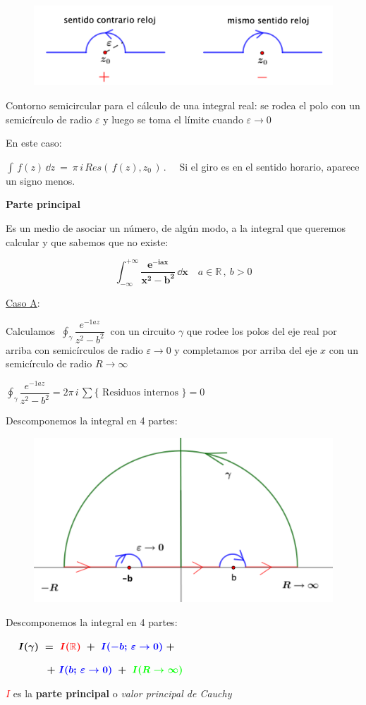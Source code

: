\begin{multicols}{2}
 \begin{figure}[H]
	\centering
	\includegraphics[width=.5\textwidth]{imagenes/img43-02.png}
\end{figure}

Contorno semicircular para el cálculo de una integral real: se rodea el polo con un semicírculo de radio $\varepsilon$ y luego se toma el límite cuando $\varepsilon \to 0$

En este caso:	
\end{multicols}
$\displaystyle \int\, f(z)\, \dd z \ = \ \pi\, i\, Res(\, f(z),z_0\, )\, . \quad$
Si el giro es en el sentido horario, aparece un signo menos.


\vspace{5mm} \textbf{Parte principal}

Es un medio de asociar un número, de algún modo, a la integral que queremos calcular y que sabemos que no existe:

$$\boldsymbol { \displaystyle \int_{-\infty}^{+\infty} \dfrac{e^{-iax}}{x^2-b^2}  \, \dd x} \quad a\in \mathbb R\, , \ b>0$$

\vspace{5mm}

\underline{Caso A}: 

Calculamos $\ \displaystyle \oint_\gamma \dfrac{e^{-1az}}{z^2-b^2}\ $ con un circuito $\gamma$ que rodee los polos del eje real por arriba con semicírculos de radio $\varepsilon \to 0$ y completamos por arriba del eje $x$ con un semicírculo de radio $R\to \infty$

$\displaystyle \oint_\gamma \dfrac{e^{-1az}}{z^2-b^2} = 2\pi\, i \, \sum \{ \text{ Residuos internos } \} =0$

Descomponemos la integral en 4 partes: 

\begin{multicols}{2}
 \begin{figure}[H]
	\centering
	\includegraphics[width=.5\textwidth]{imagenes/img43-03.png}
\end{figure}
Descomponemos la integral en 4 partes: 

$\boldsymbol{ \quad I(\gamma) \ = \ \textcolor{red}{I(\mathbb R)} \ + \ \textcolor{blue}{I(-b;\, \varepsilon\to 0)} \ + }$

$\boldsymbol{ \qquad \qquad  + \ \textcolor{blue}{I(b;\, \varepsilon\to 0)} \ + \ \textcolor{green}{I(R\to \infty)} }$

\textcolor{red}{$I$} es la \textbf{parte principal} o \emph{valor principal de Cauchy}
\end{multicols}


